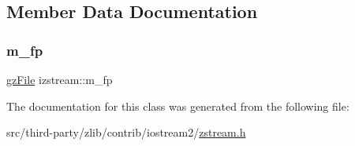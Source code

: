 \subsection{Member Data Documentation}
\mbox{\label{classizstream_a44b610d38c1a46f5b4745dfdef4752d9}} 
\subsubsection{\texorpdfstring{m\+\_\+fp}{m\_fp}}
{\footnotesize\ttfamily \mbox{\hyperlink{zlib_8h_a8e80bd9e2c359bc5bdabb2e97b4e62bf}{gz\+File}} izstream\+::m\+\_\+fp\hspace{0.3cm}{\ttfamily [private]}}



The documentation for this class was generated from the following file\+:\begin{DoxyCompactItemize}
\item 
src/third-\/party/zlib/contrib/iostream2/\mbox{\hyperlink{zstream_8h}{zstream.\+h}}\end{DoxyCompactItemize}
